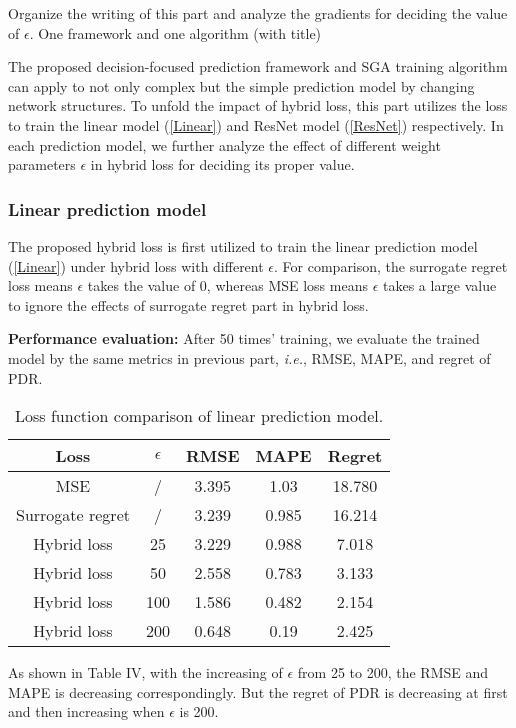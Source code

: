 \documentclass[journal]{IEEEtran}
\newcommand{\slw}{\color{blue}}
\begin{document}
{\slw Organize the writing of this part and analyze the gradients for deciding the value of $\epsilon$. One framework and one algorithm (with title)}

The proposed decision-focused prediction framework and SGA training algorithm can apply to not only complex but the simple prediction model by changing network structures. To unfold the impact of hybrid loss, this part utilizes the loss to train the linear model (\ref{Linear}) and ResNet model (\ref{ResNet}) respectively. In each prediction model, we further analyze the effect of different weight parameters $\epsilon$ in hybrid loss for deciding its proper value. 

\subsubsection{Linear prediction model}

The proposed hybrid loss is first utilized to train the  linear prediction model (\ref{Linear}) under hybrid loss with different $\epsilon$. For comparison, the surrogate regret loss means $\epsilon$ takes the value of 0, whereas MSE loss means $\epsilon$ takes a large value to ignore the effects of surrogate regret part in hybrid loss.

\textbf{Performance evaluation:}
After 50 times' training, we evaluate the trained model by the same metrics in previous part, \textit{i.e.}, RMSE, MAPE, and regret of PDR.

\begin{table}[ht]
  \renewcommand{\arraystretch}{1.3}
  \centering
  \label{linear_comparison}
  \caption{Loss function comparison of linear prediction model.}
  \begin{tabular}{ccccc}
    \hline
    Loss & $\epsilon$& RMSE & MAPE & Regret \\
    \hline
    MSE & / & 3.395 & 1.03 & 18.780 \\ 
    Surrogate regret& / & 3.239 & 0.985 & 16.214 \\
    Hybrid loss & 25 & 3.229 & 0.988 & 7.018 \\
    Hybrid loss & 50 & 2.558 & 0.783 & 3.133 \\
    Hybrid loss & 100 & 1.586 & 0.482 & 2.154 \\
    Hybrid loss & 200 & 0.648 & 0.19 & 2.425 \\
    \hline
  \end{tabular}
\end{table}

As shown in Table IV, with the increasing of $\epsilon$ from 25 to 200, the RMSE and MAPE is decreasing correspondingly. But the regret of PDR is decreasing at first and then increasing when $\epsilon$ is 200. 
\end{document}
